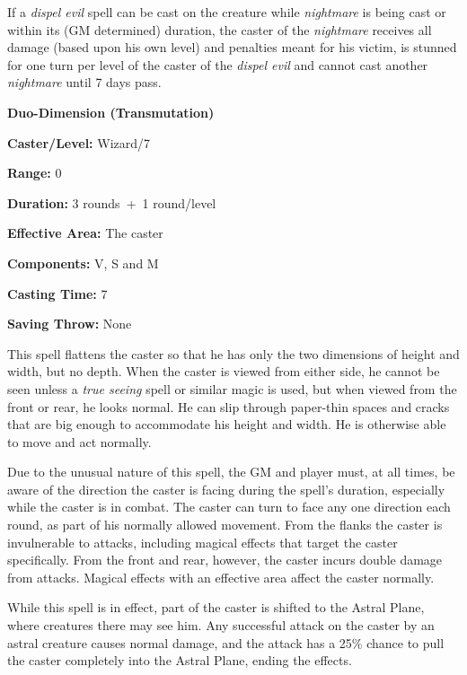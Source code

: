 \begin{multicols}{2}
If a \textit{dispel evil} spell can be cast on the creature while \textit{nightmare} is being cast or within its (GM determined) duration, the caster of the \textit{nightmare} receives all damage (based upon his own level) and penalties meant for his victim, is stunned for one turn per level of the caster of the \textit{dispel evil} and cannot cast another \textit{nightmare} until 7 days pass.  

\vspace{1em}

\noindent
\begin{minipage}{\columnwidth}

\noindent \textbf{Duo-Dimension (Transmutation)}

\noindent \textbf{Caster/Level:} Wizard/7

\noindent \textbf{Range:} 0

\noindent \textbf{Duration:} 3 rounds~+~1 round/level

\noindent \textbf{Effective Area:} The caster

\noindent \textbf{Components:} V, S and M

\noindent \textbf{Casting Time:} 7

\noindent \textbf{Saving Throw:} None

\end{minipage}

This spell flattens the caster so that he has only the two dimensions of height and width, but no depth.  When the caster is viewed from either side, he cannot be seen unless a \textit{true seeing} spell or similar magic is used, but when viewed from the front or rear, he looks normal.  He can slip through paper-thin spaces and cracks that are big enough to accommodate his height and width. He is otherwise able to move and act normally.  

Due to the unusual nature of this spell, the GM and player must, at all times, be aware of the direction the caster is facing during the spell's duration, especially while the caster is in combat.  The caster can turn to face any one direction each round, as part of his normally allowed movement.  From the flanks the caster is invulnerable to attacks, including magical effects that target the caster specifically.  From the front and rear, however, the caster incurs double damage from attacks.  Magical effects with an effective area affect the caster normally.

While this spell is in effect, part of the caster is shifted to the Astral Plane, where creatures there may see him.  Any successful attack on the caster by an astral creature causes normal damage, and the attack has a 25\% chance to pull the caster completely into the Astral Plane, ending the effects. 


\end{multicols}
